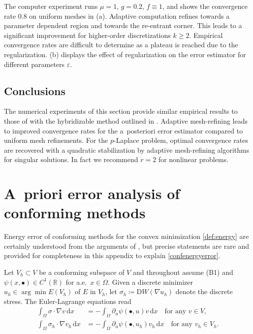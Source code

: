 \documentclass[a4paper]{amsart}
\numberwithin{equation}{section}
\renewcommand{\d}[1]{\,\mathrm{d}#1}
\newcommand{\D}{\mathrm{D}}
\theoremstyle{remark}
\begin{document}
The computer experiment runs $\mu = 1$, $g = 0.2$, $f \equiv 1$, and 
shows the convergence rate 0.8  on uniform meshes in (a). 
Adaptive computation refines towards a parameter dependent region and towards 
the re-entrant corner. This leads to a significant improvement for higher-order discretizations $k \geq 2$. Empirical convergence rates are difficult to determine as a plateau is reached due to the regularization. (b) displays the effect of regularization on the error estimator for different 
parameters $\varepsilon$.

\subsection{Conclusions}
The numerical experiments of this section provide similar empirical results to those of \cite{Tran2024} with the hybridizable method outlined in . Adaptive mesh-refining leads to improved convergence rates for the a~posteriori error estimator compared to uniform mesh refinements. For the $p$-Laplace problem, optimal convergence rates are recovered with a quadratic stabilization by adaptive mesh-refining algorithms for singular solutions. In fact we
recommend $r=2$ for nonlinear problems. 

\printbibliography

\appendix

\section{A~priori error analysis of conforming methods}\label{appendix}
Energy error of conforming methods for the convex minimization \eqref{def:energy}
are certainly understood from the arguments of \cite{GlowinskiMarrocco1975,Chow1989,CPlechac1997}, but precise statements are 
rare and provided for completeness in this appendix to explain  \eqref{confenergyerror}.

Let $V_h \subset V$ be a conforming subspace of $V$
and throughout assume (B1) and $\psi(x,\bullet) \in C^1(\mathbb{R})$ 
for a.e.~$x \in \Omega$.
%
Given a discrete minimizer $u_h \in \arg\min E(V_h)$ of $E$ in $V_h$, let $\sigma_h \coloneqq \D W(\nabla u_h)$ denote the discrete stress. The Euler-Lagrange equations read
\begin{align}
    \int_\Omega \sigma \cdot \nabla v \d{x} &= - \int_\Omega \partial_u \psi(\bullet, u) v \d{x} \quad\text{for any } v \in V,\label{eq:ELE}\\
    \int_\Omega \sigma_h \cdot \nabla v_h \d{x} &= - \int_\Omega \partial_u \psi(\bullet, u_h) v_h \d{x} \quad\text{for any } v_h \in V_h.\label{eq:dELE-conf}
\end{align}
\end{document}
